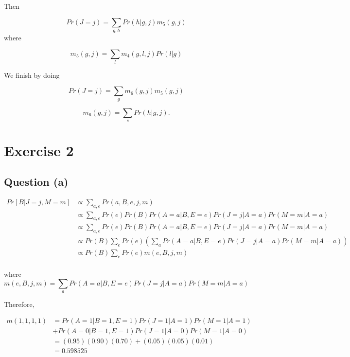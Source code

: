 \documentclass{article}
\begin{document}
Then

\begin{equation}
Pr(J=j) = \displaystyle\sum_{g, h}Pr(h|g, j)m_{5}(g, j)
\end{equation}
where

$$m_{5}(g, j)=\displaystyle\sum_{l}m_{4}(g, l, j)Pr(l|g)$$

We finish by doing


\begin{equation}
Pr(J=j) = \displaystyle\sum_{g}m_{6}(g, j)m_{5}(g, j)
\end{equation}

$$m_{6}(g, j)=\displaystyle\sum_{s}Pr(h|g, j).$$

\section{Exercise 2}
\subsection{Question (a)}
\begin{equation}
\begin{split}
Pr[B|J=j, M=m] & \propto\displaystyle\sum_{a, e}Pr(a,B, e, j, m) \\
&\propto \displaystyle\sum_{a, e}Pr(e)Pr(B)Pr(A=a|B, E=e)Pr(J=j|A=a)Pr(M=m|A=a) \\
& \propto \displaystyle\sum_{a, e}Pr(e)Pr(B)Pr(A=a|B, E=e)Pr(J=j|A=a)Pr(M=m|A=a)\\
& \propto Pr(B)\displaystyle\sum_{e}Pr(e)\left(\displaystyle\sum_{a}Pr(A=a|B, E=e)Pr(J=j|A=a)Pr(M=m|A=a)\right) \\
& \propto Pr(B)\displaystyle\sum_{e}Pr(e)m(e, B, j, m) \\
 \end{split}
\end{equation}

where $$m(e, B, j, m) =  \displaystyle\sum_{a}Pr(A=a|B, E=e)Pr(J=j|A=a)Pr(M=m|A=a) $$

Therefore,

\begin{equation}\begin{split}
m(1, 1, 1, 1) &= Pr(A=1|B=1, E=1)Pr(J=1|A=1)Pr(M=1|A=1) \\ & + Pr(A=0|B=1, E=1)Pr(J=1|A=0)Pr(M=1|A=0) \\
& = (0.95)(0.90)(0.70) + (0.05)(0.05)(0.01)\\
& = 0.598525
\end{split}
\end{equation}
\end{document}
